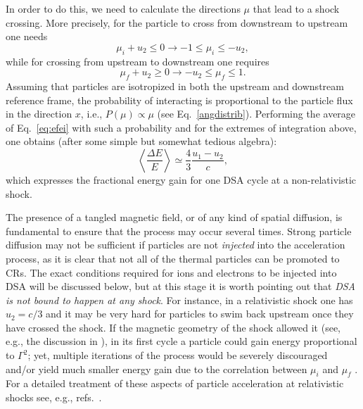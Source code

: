 \documentclass[varenna]{cimento}
\begin{document}
In order to do this, we need to calculate the directions $\mu$ that lead to a shock crossing.
More precisely, for the particle to cross from downstream to upstream one needs 
\begin{equation}
    \mu_i+u_2\leq 0 \to -1\leq \mu_i\leq -u_2,
\end{equation}
while for crossing from upstream to downstream one requires
\begin{equation}
    \mu_f+u_2\geq 0 \to -u_2\leq \mu_f \leq 1.
\end{equation}
Assuming that particles are isotropized in both the upstream and downstream reference frame, the probability of interacting is proportional to the particle flux in the direction $x$, i.e., $P(\mu)\propto\mu$ (see Eq.~\ref{angdistrib}).
Performing the average of Eq.~\ref{eq:efei} with such a probability and for the extremes of integration above, one obtains (after some simple but somewhat tedious algebra):
\begin{equation}\label{studio}
    \left\langle \frac{\Delta E}{E}\right\rangle\simeq \frac{4}{3}\frac{u_1-u_2}{c},
\end{equation}
which expresses the fractional energy gain for one DSA cycle at a non-relativistic shock.

The presence of a tangled magnetic field, or of any kind of spatial diffusion, is fundamental to ensure that the process may occur several times.
Strong particle diffusion may not be sufficient if particles are not \emph{injected} into the acceleration process, as it is clear that not all of the thermal particles can be promoted to CRs.
The exact conditions required for ions and electrons to be injected into DSA will be discussed below, but at this stage it is worth pointing out that \emph{DSA is not bound to happen at any shock}.
For instance, in a relativistic shock one has $u_2=c/3$ and it may be very hard for particles to swim back upstream once they have crossed the shock.
If the magnetic geometry of the shock allowed it (see, e.g., the discussion in \cite{sironi+09}), in its first cycle a particle could gain energy proportional to $\Gamma^2$; 
yet, multiple iterations of the process would be severely discouraged and/or yield much smaller energy gain due to the correlation between $\mu_i$ and $\mu_f$ \cite{achterberg+01}.
For a detailed treatment of these aspects of particle acceleration at relativistic shocks see, e.g., refs.~\cite{vietri03,blasi+05,morlino+07a,morlino+07b}.
\end{document}
